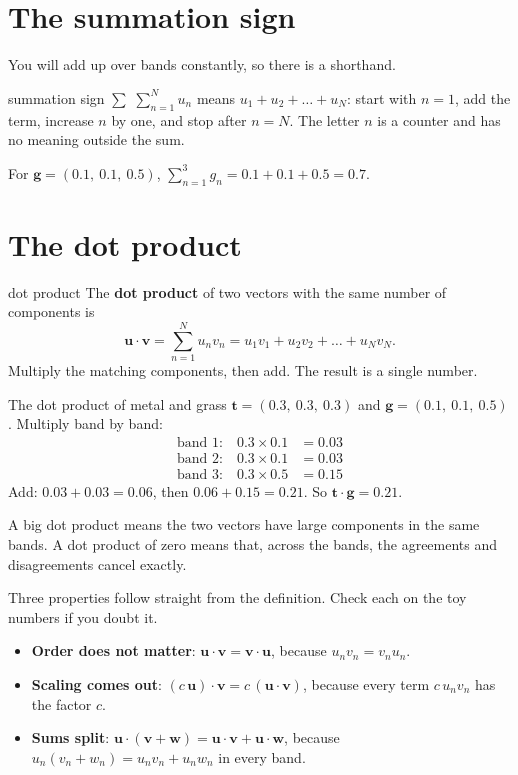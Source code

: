 \documentclass[11pt,a4paper,oneside,openany]{book}
\newcommand{\B}[1]{{\symbf{#1}}}
\newcommand{\B}[1]{{\bm{#1}}}
\newcommand{\vt}{\B{t}}
\newcommand{\vu}{\B{u}}
\newcommand{\vv}{\B{v}}
\newcommand{\vw}{\B{w}}
\newcommand{\vg}{\B{g}}
\begin{document}
\section{The summation sign}

You will add up over bands constantly, so there is a shorthand.

\begin{defn}{summation sign $\sum$}
$\displaystyle\sum_{n=1}^{N} u_n$ means $u_1+u_2+\dots+u_N$: start with $n=1$, add the term, increase $n$ by one, and stop
after $n=N$. The letter $n$ is a counter and has no meaning outside the sum.
\end{defn}

For $\vg=(0.1,\ 0.1,\ 0.5)$, $\sum_{n=1}^{3} g_n = 0.1+0.1+0.5 = 0.7$.

\section{The dot product}

\begin{defn}{dot product}
The \textbf{dot product} of two vectors with the same number of components is
\[
  \vu\cdot\vv=\sum_{n=1}^{N}u_n v_n=u_1v_1+u_2v_2+\dots+u_Nv_N .
\]
Multiply the matching components, then add. The result is a single number.
\end{defn}

\begin{worked}[label=we:dot]{The dot product of metal and grass}
$\vt=(0.3,\ 0.3,\ 0.3)$ and $\vg=(0.1,\ 0.1,\ 0.5)$. Multiply band by band:
\begin{align*}
\text{band 1:}\quad 0.3\times0.1 &= 0.03\\
\text{band 2:}\quad 0.3\times0.1 &= 0.03\\
\text{band 3:}\quad 0.3\times0.5 &= 0.15
\end{align*}
Add: $0.03+0.03=0.06$, then $0.06+0.15=0.21$. So $\vt\cdot\vg=0.21$.
\end{worked}

A big dot product means the two vectors have large components in the same bands. A dot product of zero means that,
across the bands, the agreements and disagreements cancel exactly.

Three properties follow straight from the definition. Check each on the toy numbers if you doubt it.
\begin{itemize}
\item \textbf{Order does not matter}: $\vu\cdot\vv=\vv\cdot\vu$, because $u_nv_n=v_nu_n$.
\item \textbf{Scaling comes out}: $(c\,\vu)\cdot\vv=c\,(\vu\cdot\vv)$, because every term $c\,u_nv_n$ has the factor $c$.
\item \textbf{Sums split}: $\vu\cdot(\vv+\vw)=\vu\cdot\vv+\vu\cdot\vw$, because $u_n(v_n+w_n)=u_nv_n+u_nw_n$ in every band.
\end{itemize}
\end{document}
